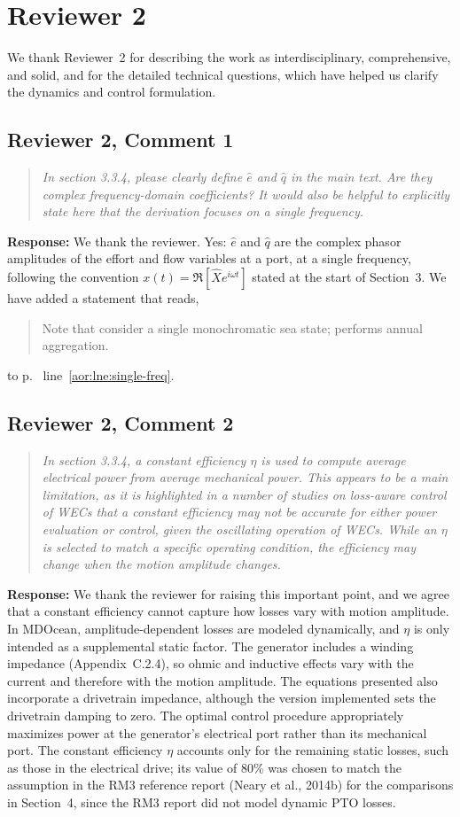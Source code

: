 \documentclass[11pt]{article}
\newcommand{\rcomment}[2]{\subsection*{#1}\begin{quote}\itshape #2\end{quote}}
\newcommand{\response}{\noindent\textbf{Response:} }
\begin{document}
\clearpage
\section*{Reviewer 2}

We thank Reviewer~2 for describing the work as interdisciplinary, comprehensive, and solid, and for the detailed technical questions, which have helped us clarify the dynamics and control formulation.

\rcomment{Reviewer 2, Comment 1}{In section 3.3.4, please clearly define $\hat{e}$ and $\hat{q}$ in the main text. Are they complex frequency-domain coefficients? It would also be helpful to explicitly state here that the derivation focuses on a single frequency.}
\response We thank the reviewer. Yes: $\hat{e}$ and $\hat{q}$ are the complex phasor amplitudes of the effort and flow variables at a port, at a single frequency, following the convention $x(t) = \Re[\hat{X} e^{i\omega t}]$ stated at the start of Section~3.
We have added a statement that reads,
\begin{quote}
Note that  consider a single monochromatic sea state;  performs annual aggregation.
\end{quote}
to p.~\pageref{aor:lne:single-freq} line~\ref{aor:lne:single-freq}.

\rcomment{Reviewer 2, Comment 2}{In section 3.3.4, a constant efficiency $\eta$ is used to compute average electrical power from average mechanical power. This appears to be a main limitation, as it is highlighted in a number of studies on loss-aware control of WECs that a constant efficiency may not be accurate for either power evaluation or control, given the oscillating operation of WECs. While an $\eta$ is selected to match a specific operating condition, the efficiency may change when the motion amplitude changes.}
\response We thank the reviewer for raising this important point, and we agree that a constant efficiency cannot capture how losses vary with motion amplitude.
In MDOcean, amplitude-dependent losses are modeled dynamically, and $\eta$ is only intended as a supplemental static factor.
The generator includes a winding impedance (Appendix~C.2.4), so ohmic and inductive effects vary with the current and therefore with the motion amplitude.
The equations presented also incorporate a drivetrain impedance, although the version implemented sets the drivetrain damping to zero.
The optimal control procedure appropriately maximizes power at the generator's electrical port rather than its mechanical port.
The constant efficiency $\eta$ accounts only for the remaining static losses, such as those in the electrical drive;
its value of 80\% was chosen to match the assumption in the RM3 reference report (Neary et al., 2014b) for the comparisons in Section~4, since the RM3 report did not model dynamic PTO losses.
\end{document}
